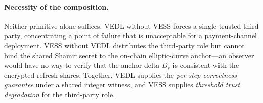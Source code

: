 \paragraph{Necessity of the composition.}
Neither primitive alone suffices. VEDL without VESS forces a single trusted third party, concentrating a point of failure that is unacceptable for a payment-channel deployment. VESS without VEDL distributes the third-party role but cannot bind the shared Shamir secret to the on-chain elliptic-curve anchor---an observer would have no way to verify that the anchor delta $D_s$ is consistent with the encrypted refresh shares. Together, VEDL supplies the \emph{per-step correctness guarantee} under a shared integer witness, and VESS supplies \emph{threshold trust degradation} for the third-party role.
